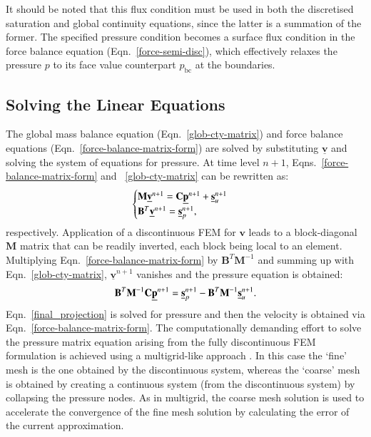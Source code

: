 \documentclass[preprint,authoryear,12pt]{elsarticle}
\begin{document}
It should be noted that this flux condition must be used in both the
discretised saturation and global continuity equations, since the
latter is a summation of the former. The specified pressure condition
becomes a surface flux condition in the force balance equation
(Eqn.~\ref{force-semi-disc}), which effectively relaxes the pressure
$p$ to its face value counterpart $p_\text{bc}$ at the boundaries.


\subsection{Solving the Linear Equations}\label{Section:SolvingLinearEqns}
The global mass balance equation (Eqn.~\ref{glob-cty-matrix}) and
force balance equations (Eqn.~\ref{force-balance-matrix-form}) are
solved by substituting $\underline{\mathbf v}$ and solving the system
of equations for pressure. At time level $n+1$,
Eqns.~\ref{force-balance-matrix-form} and ~\ref{glob-cty-matrix} can
be rewritten as:
\begin{displaymath}
  \begin{cases}
    \mathbf{M} \underline{\bf v}^{n+1} = \mathbf{C}\underline{\bf
      p}^{n+1} + \underline{\bf s}_{u}^{n+1} \\ \mathbf{B}^{T}
    \underline{\bf v}^{n+1} = \underline{\bf s}_{p}^{n+1},
  \end{cases}
\end{displaymath}
respectively. Application of a discontinuous FEM for
$\mathbf{v}$ leads to a block-diagonal $\mathbf{M}$ matrix that
can be readily inverted, each block being local to an
element. Multiplying Eqn.~\ref{force-balance-matrix-form} by
$\mathbf{B}^{T}\mathbf{M}^{-1}$ and summing up with
Eqn.~\ref{glob-cty-matrix}, $\underline{\mathbf v}^{n+1}$
vanishes and the pressure equation is obtained:
\begin{equation}
  \mathbf{B}^{T}\mathbf{M}^{-1} \mathbf{C} \underline{\bf p}^{n+1} =
  \underline{\bf s}_{p}^{n+1} - \mathbf{B}^{T} \mathbf{M}^{-1}
  \underline{\bf s}_{u}^{n+1}.
  \label{final_projection}
\end{equation}
Eqn.~\ref{final_projection} is solved for pressure and then the
velocity is obtained via Eqn.~\ref{force-balance-matrix-form}. The
computationally demanding effort to solve the pressure matrix equation
arising from the fully discontinuous FEM formulation is achieved using
a multigrid-like approach \citep[see][]{Brandt}. In this case the
`fine' mesh is the one obtained by the discontinuous system, whereas
the `coarse' mesh is obtained by creating a continuous system (from
the discontinuous system) by collapsing the pressure nodes. As in
multigrid, the coarse mesh solution is used to accelerate the
convergence of the fine mesh solution by calculating the error of the
current approximation.
\end{document}
